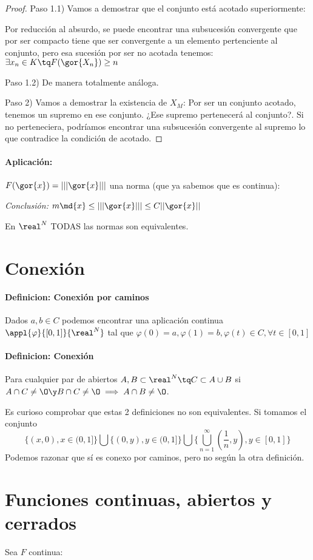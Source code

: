 \documentclass[a4paper,10pt]{apuntes}
\newcommand{\definition}[1]{\paragraph{Definicion: #1\\}}
\begin{document}
\begin{proof}
 Paso 1.1) Vamos a demostrar que el conjunto está acotado superiormente:
 
 Por reducción al absurdo, se puede encontrar una subsucesión convergente que por ser compacto tiene que ser convergente a un elemento pertenciente al conjunto, pero esa sucesión por ser no acotada tenemos: $\exists x_n \in K \tq F(\gor{X_n}) \ge n$
 
 Paso 1.2) De manera totalmente análoga.
 
 Paso 2) Vamos a demostrar la existencia de $X_M$:
 Por ser un conjunto acotado, tenemos un supremo en ese conjunto. ¿Ese supremo pertenecerá al conjunto?. Si no perteneciera, podríamos encontrar una subsucesión convergente al supremo lo que contradice la condición de acotado.
\end{proof}

\paragraph{Aplicación:}
$F(\gor{x}) = |||\gor{x}|||$ una norma (que ya sabemos que es continua):

\emph{Conclusión:} $m \md{x} \leq |||\gor{x}||| \leq C||\gor{x}||$

\begin{theorem}
En $\real^N$ TODAS las normas son equivalentes. 
\end{theorem}

\section{Conexión}
\definition{Conexión por caminos}
Dados $a,b \in C$ podemos encontrar una aplicación continua $\appl{\varphi}{[0,1]}{\real^N}$ tal que $\varphi(0) = a, \varphi(1) = b, \varphi(t) \in C, \forall t \in [0,1]$
\definition{Conexión}
Para cualquier par de abiertos $A,B \subset \real^N \tq C\subset A\cup B$ si $A\cap C\neq \O \y B\cap C \neq \O \implies A\cap B \neq \O$.
\begin{remark}
Es curioso comprobar que estas 2 definiciones no son equivalentes. Si tomamos el conjunto
$$\displaystyle\{(x,0), x\in (0,1]\} \bigcup \{(0,y), y \in (0,1]\} \bigcup \{\displaystyle\bigcup_{n=1}^{\infty}{\left(\frac{1}{n},y\right), y \in [0,1]}\}$$
Podemos razonar que sí es conexo por caminos, pero no según la otra definición.
\end{remark}
\section{Funciones continuas, abiertos y cerrados}
Sea $F$ continua:
\end{document}
